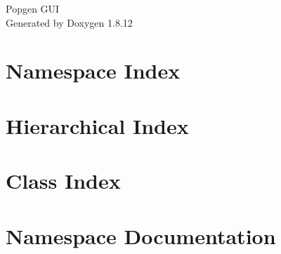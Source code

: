 \documentclass[twoside]{book}
\newcommand{\+}{\discretionary{\mbox{\scriptsize$\hookleftarrow$}}{}{}}
\newcommand{\clearemptydoublepage}{%
  \newpage{\pagestyle{empty}\cleardoublepage}%
}
\begin{document}
\hypersetup{pageanchor=false,
             bookmarksnumbered=true,
             pdfencoding=unicode
            }
\begin{titlepage}
\vspace*{7cm}
\begin{center}%
{\Large Popgen G\+UI }\\
\vspace*{1cm}
{\large Generated by Doxygen 1.8.12}\\
\end{center}
\end{titlepage}
\clearemptydoublepage
{}
\tableofcontents
\clearemptydoublepage
{}
\hypersetup{pageanchor=true}

\chapter{Namespace Index}

\chapter{Hierarchical Index}

\chapter{Class Index}

\chapter{Namespace Documentation}


























\end{document}

